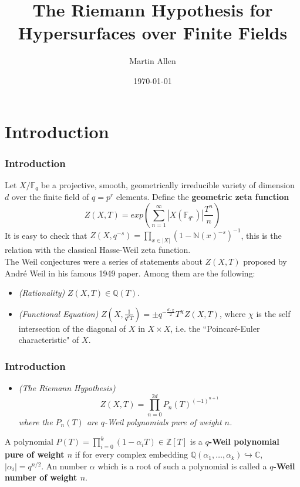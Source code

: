 \documentclass{beamer}
\title[RH for Hypersurfaces]{The Riemann Hypothesis for Hypersurfaces over Finite Fields} %
\author{Martin Allen} %
\institute[Universit\'{a} di Milano/ Universit\'{e} Paris-Sud] %
{
Universit\'{a} di Milano\\ Universit\'{e} Paris-Sud \\ %
\medskip
\begin{center}
Advisors: Prof. Tam\'{a}s Szamuely, Prof. David Harari
\end{center}}
\date{\today} %
\begin{document}
\begin{frame}
\titlepage %
\end{frame}



\section{Introduction} 



\begin{frame}
\frametitle{Introduction}
Let $X/\mathbb{F}_{q}$ be a projective, smooth, geometrically irreducible variety of dimension $d$ over the finite field of $q=p^{r}$ elements. Define the \textbf{geometric zeta function}
$$Z(X,T) = exp(\sum\limits_{n=1}^{\infty}|X(\mathbb{F}_{q^{n}})|\frac{T^{n}}{n})$$
\pause
It is easy to check that $Z(X,q^{-s}) = \prod\limits_{x\in |X|}(1-\mathbb{N}(x)^{-s})^{-1}$, this is the relation with the classical Hasse-Weil zeta function.
\pause
\\The Weil conjectures were a series of statements about $Z(X,T)$ proposed by Andr\'{e} Weil in his famous 1949 paper. Among them are the following:
\begin{itemize}
\pause 
\item \emph{(Rationality)} $Z(X,T)\in \mathbb{Q}(T)$.
\pause
\item \emph{(Functional Equation)} $Z(X,\frac{1}{q^{d}T}) = \pm q^{-\frac{d\cdot \chi}{2}}T^{\chi}Z(X,T)$, where $\chi$ is the self intersection of the diagonal of $X$ in $X\times X$, i.e. the ``Poincar\'{e}-Euler characteristic" of $X$. 
\end{itemize}
\end{frame}


\begin{frame}
\frametitle{Introduction}
\begin{itemize}
\pause
\item \emph{(The Riemann Hypothesis) 
$$Z(X,T) = \prod\limits_{n=0}^{2d}P_{n}(T)^{(-1)^{n+1}}$$ where the $P_{n}(T)$ are $q$-Weil polynomials pure of weight $n$.} 
\end{itemize}
\pause
A polynomial $P(T) = \prod\limits_{i=0}^{k}(1-\alpha_{i}T) \in \mathbb{Z}[T]$ is a $q$\textbf{-Weil polynomial pure of weight $n$} if for every complex embedding $\mathbb{Q}(\alpha_{1},\ldots,\alpha_{k})\hookrightarrow \mathbb{C}$, $|\alpha_{i}| = q^{n/2}$. An number $\alpha$  which is a root of such a polynomial is called a \textbf{$q$-Weil number of weight $n$}. 
\end{frame}
\end{document}

